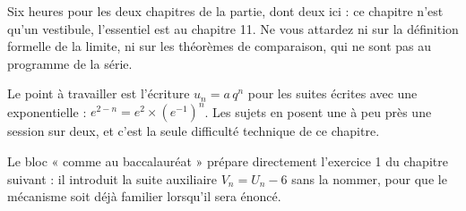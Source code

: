 \begin{notepourlaclasse}
Six heures pour les deux chapitres de la partie, dont deux ici : ce chapitre
n'est qu'un vestibule, l'essentiel est au chapitre 11. Ne vous attardez ni
sur la définition formelle de la limite, ni sur les théorèmes de comparaison,
qui ne sont pas au programme de la série.

Le point à travailler est l'écriture $u_{n} = a\,q^{n}$ pour les suites
écrites avec une exponentielle : $e^{2-n} = e^{2}\times\left(e^{-1}\right)^{n}$.
Les sujets en posent une à peu près une session sur deux, et c'est la seule
difficulté technique de ce chapitre.

Le bloc « comme au baccalauréat » prépare directement l'exercice 1 du
chapitre suivant : il introduit la suite auxiliaire $V_{n} = U_{n}-6$ sans
la nommer, pour que le mécanisme soit déjà familier lorsqu'il sera énoncé.
\end{notepourlaclasse}
